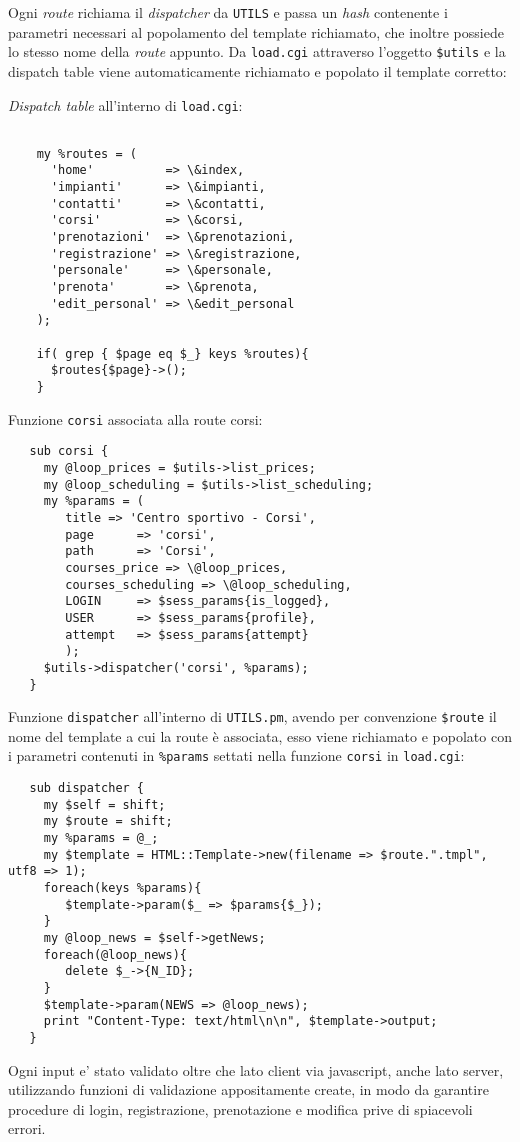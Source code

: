 Ogni \textit{route} richiama il \textit{dispatcher} da \texttt{UTILS} e passa un \textit{hash} contenente i parametri necessari al popolamento del template richiamato, che inoltre possiede lo stesso nome della \textit{route} appunto.\newline
Da \texttt{load.cgi} attraverso l'oggetto \texttt{\$utils} e la dispatch table viene automaticamente richiamato e popolato il template corretto: \newline \newline

\small{\textit{Dispatch table} all'interno di \texttt{load.cgi}:}


\scriptsize{
\begin{verbatim}

    my %routes = (
      'home'          => \&index,
      'impianti'      => \&impianti,
      'contatti'      => \&contatti,
      'corsi'         => \&corsi,
      'prenotazioni'  => \&prenotazioni,
      'registrazione' => \&registrazione,
      'personale'     => \&personale,
      'prenota'       => \&prenota,
      'edit_personal' => \&edit_personal
    );

    if( grep { $page eq $_} keys %routes){
      $routes{$page}->();
    }

\end{verbatim}
}

\small{Funzione \texttt{corsi} associata alla route corsi:}

\scriptsize{
\begin{verbatim}
   sub corsi {
     my @loop_prices = $utils->list_prices;
     my @loop_scheduling = $utils->list_scheduling;
     my %params = (
        title => 'Centro sportivo - Corsi',
        page      => 'corsi',
        path      => 'Corsi',
        courses_price => \@loop_prices,
        courses_scheduling => \@loop_scheduling,
        LOGIN     => $sess_params{is_logged},
        USER      => $sess_params{profile},
        attempt   => $sess_params{attempt}
        );
     $utils->dispatcher('corsi', %params);
   }
\end{verbatim}
}
\small{Funzione \texttt{dispatcher} all'interno di \texttt{UTILS.pm}, avendo per convenzione \texttt{\$route} il nome del template a cui la route è associata, esso viene richiamato e popolato con i parametri contenuti in \texttt{\%params} settati nella funzione \texttt{corsi} in \texttt{load.cgi}:}
 
\scriptsize{
\begin{verbatim}
   sub dispatcher {
     my $self = shift;
     my $route = shift;
     my %params = @_;
     my $template = HTML::Template->new(filename => $route.".tmpl", utf8 => 1);
     foreach(keys %params){
        $template->param($_ => $params{$_});
     }	
     my @loop_news = $self->getNews;
     foreach(@loop_news){
        delete $_->{N_ID};
     }
     $template->param(NEWS => @loop_news);
     print "Content-Type: text/html\n\n", $template->output;
   }
\end{verbatim}
}
Ogni input e' stato validato oltre che lato client via javascript, anche lato server, utilizzando funzioni di validazione appositamente create, in modo da garantire procedure di login, registrazione, prenotazione e modifica prive di spiacevoli errori.
